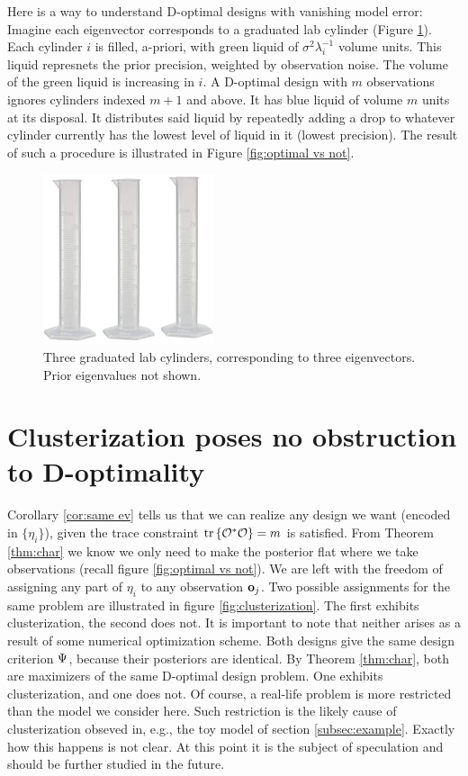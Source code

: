 Here is a way to understand D-optimal designs with vanishing model
error: Imagine each eigenvector corresponds to a graduated lab
cylinder (Figure \ref{fig:cylinder}). Each cylinder $i$ is filled,
a-priori, with green liquid of $\sigma^2\lambda_i^{-1}$ volume
units. This liquid represnets the prior precision, weighted by
observation noise. The volume of the green liquid is increasing in
$i$. A D-optimal design with $m$ observations ignores cylinders
indexed $m+1$ and above. It has blue liquid of volume $m$ units at its
disposal. It distributes said liquid by repeatedly adding a drop to
whatever cylinder currently has the lowest level of liquid in it
(lowest precision). The result of such a procedure is illustrated in
Figure \ref{fig:optimal vs not}.

\begin{figure}%
    \includegraphics[width=5cm, height=5cm]{cylinders.jpg}
    \caption{Three graduated lab cylinders, corresponding to three
      eigenvectors. Prior eigenvalues not shown.}
    \label{fig:cylinder}
\end{figure}



\section{Clusterization poses no obstruction to D-optimality}\label{section:clusterization}
Corollary \ref{cor:same ev} tells us that we can realize any design we
want (encoded in $\{\eta_i\}$), given the trace constraint
$\textup{tr}\left \{\mathcal{O}^*\mathcal{O} \right \} = m$ is satisfied. From Theorem \ref{thm:char} we
know we only need to make the posterior flat where we take
observations (recall figure \ref{fig:optimal vs not}). We are left
with the freedom of assigning any part of $\eta_i$ to any observation
$\mathbf{o}_j$. Two possible assignments for the same problem are
illustrated in figure \ref{fig:clusterization}. The first exhibits
clusterization, the second does not. It is important to note that
neither arises as a result of some numerical optimization scheme. Both
designs give the same design criterion $\Psi$, because their
posteriors are identical. By Theorem \ref{thm:char}, both are
maximizers of the same D-optimal design problem. One exhibits
clusterization, and one does not. Of course, a real-life problem is
more restricted than the model we consider here. Such restriction is
the likely cause of clusterization obseved in, e.g., the toy model of
section \ref{subsec:example}. Exactly how this happens is not
clear. At this point it is the subject of speculation and should be
further studied in the future.

